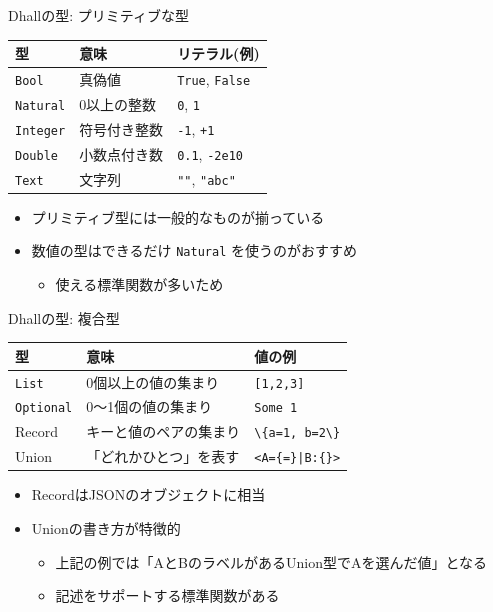 \documentclass[unicode,12pt]{beamer}
\begin{document}
\begin{frame}{Dhallの型: プリミティブな型}
  \centering
  \begin{tabular}{lll} \hline
    型 & 意味 & リテラル(例)\\ \hline
    \texttt{Bool} & 真偽値 & \texttt{True}, \texttt{False}\\
    \texttt{Natural} & 0以上の整数 & \texttt{0}, \texttt{1}\\
    \texttt{Integer} & 符号付き整数 & \texttt{-1}, \texttt{+1}\\
    \texttt{Double} & 小数点付き数 & \texttt{0.1}, \texttt{-2e10}\\
    \texttt{Text} & 文字列 & \texttt{""}, \texttt{"abc"}\\ \hline
  \end{tabular}

  \begin{itemize}
  \item プリミティブ型には一般的なものが揃っている
  \item 数値の型はできるだけ \texttt{Natural} を使うのがおすすめ
    \begin{itemize}
    \item 使える標準関数が多いため
    \end{itemize}
  \end{itemize}
\end{frame}

\begin{frame}{Dhallの型: 複合型}
  \centering
  \begin{tabular}{lll} \hline
    型 & 意味 & 値の例\\ \hline
    \texttt{List} & 0個以上の値の集まり & \lstinline|[1,2,3]| \\
    \texttt{Optional} & 0〜1個の値の集まり & \lstinline|Some 1| \\
    Record & キーと値のペアの集まり & \lstinline|\{a=1, b=2\}| \\
    Union & 「どれかひとつ」を表す & {\footnotesize\texttt{<A=\{=\}|B:\{\}>}} \\ \hline
  \end{tabular}

  \begin{itemize}
  \item RecordはJSONのオブジェクトに相当
  \item Unionの書き方が特徴的
    \begin{itemize}
    \item 上記の例では「AとBのラベルがあるUnion型でAを選んだ値」となる
    \item 記述をサポートする標準関数がある
    \end{itemize}
  \end{itemize}
\end{frame}
\end{document}

